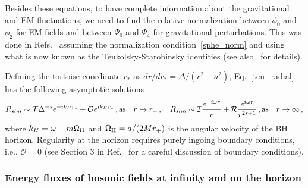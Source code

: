 \documentclass[11pt]{article}
\newcommand{\be}{\begin{equation}}
\newcommand{\ee}{\end{equation}}
\numberwithin{equation}{section} %
\begin{document}
Besides these equations, to have complete information about the gravitational and EM fluctuations, we need to find the 
relative normalization between $\phi_0$ and $\phi_2$ for EM fields and between $\Psi_0$ and $\Psi_4$ for 
gravitational perturbations. This was done in Refs.~\cite{Teukolsky:1974yv,1973ZhETF..65....3S,Staro2} assuming the 
normalization condition~\eqref{sphe_norm} and using what is now known as the Teukolsky-Starobinsky identities (see 
also~\cite{Chandra} for details). 


Defining the tortoise coordinate $r_*$ as $dr/dr_*=\Delta/(r^2+a^2)$, Eq.~\eqref{teu_radial} has the following asymptotic solutions
%
\be\label{bc_kerr}
R_{slm}\sim \mathcal{T}\Delta^{-s} e^{-ik_H r_*}+\mathcal{O} e^{ik_H r_*}\,, {\rm as}\quad r \to r_+\,,\quad 
R_{slm}\sim \mathcal{I}\frac{e^{-i\omega r}}{r}+\mathcal{R}\frac{e^{i\omega r}}{r^{2s+1}}\,, {\rm as} \quad r \to \infty\,,
\ee
%
where $k_H=\omega-m\Omega_{\rm H}$ and $\Omega_{\rm H}=a/(2M r_+)$ is the angular velocity of the BH horizon. Regularity at the horizon requires purely ingoing boundary conditions, i.e., $\mathcal{O}=0$ (see Section 3 in Ref.~\cite{Berti:2009kk} for a careful discussion of boundary conditions).

\subsubsection{Energy fluxes of bosonic fields at infinity and on the horizon} 
\end{document}
